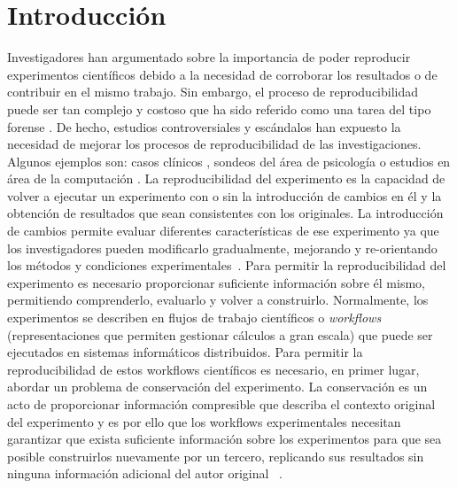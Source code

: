 \chapter{Introducción}
\label{Chapter1} 
\newcommand{\keyword}[1]{\textbf{#1}}
\newcommand{\tabhead}[1]{\textbf{#1}}
\newcommand{\code}[1]{\texttt{#1}}
\newcommand{\file}[1]{\texttt{\bfseries#1}}
\newcommand{\option}[1]{\texttt{\itshape#1}}
Investigadores han argumentado sobre la importancia de poder reproducir experimentos científicos debido a la necesidad de corroborar los resultados o de contribuir en el mismo trabajo.   
Sin embargo, el proceso de reproducibilidad puede ser tan complejo y costoso que ha sido referido como una tarea del tipo forense \cite{baggerly2009deriving}.
De hecho, estudios controversiales y escándalos han expuesto la necesidad de mejorar los procesos de reproducibilidad de las investigaciones. Algunos ejemplos son: casos clínicos \cite{ioannidis2009repeatability}, sondeos del área de psicología \cite{open2015estimating} o estudios en área de la computación \cite{baggerly2009deriving}.
La reproducibilidad del experimento es la capacidad de volver a ejecutar un experimento con o sin la introducción de cambios en él y la obtención de resultados que sean consistentes con los originales.
La introducción de cambios permite evaluar diferentes características de ese experimento ya que los investigadores pueden modificarlo gradualmente, mejorando y re-orientando los métodos y condiciones experimentales~\cite{stodden2010reproducible}.
Para permitir la reproducibilidad del experimento es necesario proporcionar suficiente información sobre él mismo, permitiendo comprenderlo, evaluarlo y volver a construirlo. 
Normalmente, los experimentos se describen en flujos de trabajo científicos o \emph{workflows} (representaciones que permiten gestionar cálculos a gran escala) que puede ser ejecutados en sistemas informáticos distribuidos.
Para permitir la reproducibilidad de estos workflows científicos es necesario, en primer lugar, abordar un problema de conservación del experimento.
La conservación es un acto de proporcionar información compresible que describa el contexto original del experimento y es por ello que los workflows experimentales necesitan garantizar que exista suficiente información sobre los experimentos para que sea posible construirlos nuevamente por un tercero, replicando sus resultados sin ninguna información adicional del autor original ~\cite{garijo2013quantifying}.
